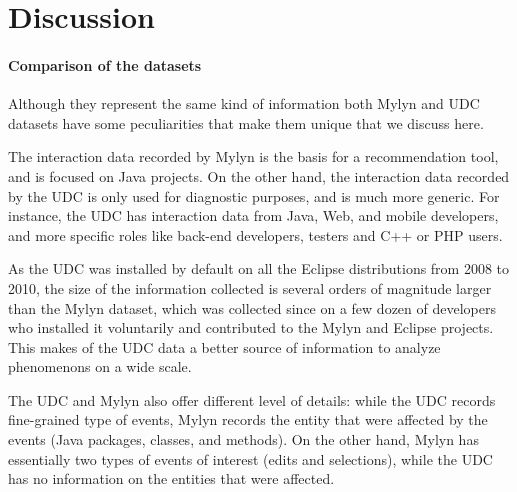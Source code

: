 \documentclass[times]{smrauth}
\begin{document}
\section{Discussion}

\paragraph{Comparison of the datasets}
Although they represent the same kind of information both Mylyn and UDC datasets have some peculiarities that make them unique that we discuss here.

The interaction data recorded by Mylyn is the basis for a recommendation tool, and is focused on Java projects. On the other hand, the interaction data recorded by the UDC is only used for diagnostic purposes, and is much more generic. For instance, the UDC has interaction data from Java, Web, and mobile developers, and more specific roles like back-end developers, testers and C++ or PHP users. 

As the UDC was installed by default on all the Eclipse distributions from 2008 to 2010, the size of the information collected is several orders of magnitude larger than the Mylyn dataset, which was collected since on a few dozen of developers who installed it voluntarily and contributed to the Mylyn and Eclipse projects. This makes of the UDC data a better source of information to analyze phenomenons on a wide scale.

The UDC and Mylyn also offer different level of details: while the UDC records fine-grained type of events, Mylyn records the entity that were affected by the events (Java packages, classes, and methods). On the other hand, Mylyn has essentially two types of events of interest (edits and selections), while the UDC has no information on the entities that were affected.




\end{document}
